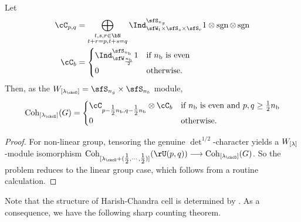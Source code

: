 \documentclass[counting_main.tex]{subfiles}
\begin{document}
\begin{lem}
  Let
\[
  \begin{split}
    \cC_{p,q} &= \bigoplus_{\substack{t,s,r\in \bN\\t+r=p, t+s = q}}
    \Ind_{\sfW_{t}\times \sfS_s\times \sfS_r}^{\sfS_{n_g}}
 1\otimes \sgn \otimes \sgn \\
 \cC_{b} &= \begin{cases}
  \Ind_{\sfW_{\frac{\nbb}{2}}}^{\sfS_{\nbb}} 1 & \text{if $\nbb$ is even}\\
  0 & \text{otherwise}.
 \end{cases}
  \end{split}
\]
Then, as the $\WLamck =\sfS_{n_g}\times \sfS_{n_b}$ module,
\[
  \Coh_{\Lamck}(G) = \begin{cases}
    \cC_{p-\half \nbb,q-\half \nbb}\otimes \cC_{b} & \text{if $\nbb$ is even and
      $p,q \geq \half \nbb$}\\
    0 & \text{otherwise}.
  \end{cases}
\]
\end{lem}
\begin{proof}
  For non-linear group, tensoring the genuine $\det^{1/2}$-character yields a
  $W_{{[\lambda]}}$-module isomorphism
  $\Coh_{[\lamck+(\half, \cdots, \half)]}(\rU(p,q)) \longrightarrow \Coh_{\Lamck}(G)$.
  So the problem reduces to the linear group case, which follows from a routine
  calculation.
\end{proof}





Note that the structure of Harish-Chandra cell is determined by \cite{Bo}.
As a consequence, we have the following sharp counting theorem.
\end{document}
